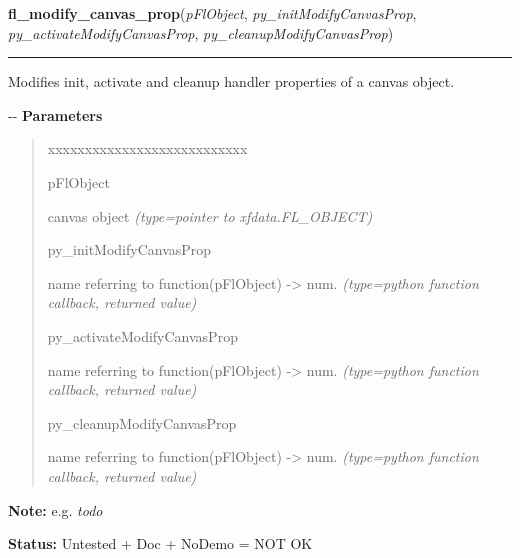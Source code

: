 \hspace{.8\funcindent}\begin{boxedminipage}{\funcwidth}

    \raggedright \textbf{fl\_modify\_canvas\_prop}(\textit{pFlObject}, \textit{py\_initModifyCanvasProp}, \textit{py\_activateModifyCanvasProp}, \textit{py\_cleanupModifyCanvasProp})

    \vspace{-1.5ex}

    \rule{\textwidth}{0.5\fboxrule}
\setlength{\parskip}{2ex}

Modifies init, activate and cleanup handler properties of a canvas
object.

-{}-
\setlength{\parskip}{1ex}
      \textbf{Parameters}
      \vspace{-1ex}

      \begin{quote}
        \begin{Ventry}{xxxxxxxxxxxxxxxxxxxxxxxxxxx}

          \item[pFlObject]


canvas object
            {\it (type=pointer to xfdata.FL\_OBJECT)}

          \item[py\_initModifyCanvasProp]


name referring to function(pFlObject) -> num.
            {\it (type=python function callback, returned value)}

          \item[py\_activateModifyCanvasProp]


name referring to function(pFlObject) -> num.
            {\it (type=python function callback, returned value)}

          \item[py\_cleanupModifyCanvasProp]


name referring to function(pFlObject) -> num.
            {\it (type=python function callback, returned value)}

        \end{Ventry}

      \end{quote}

\textbf{Note:} 
e.g. \emph{todo}


\textbf{Status:} 
Untested + Doc + NoDemo = NOT OK


    \end{boxedminipage}

